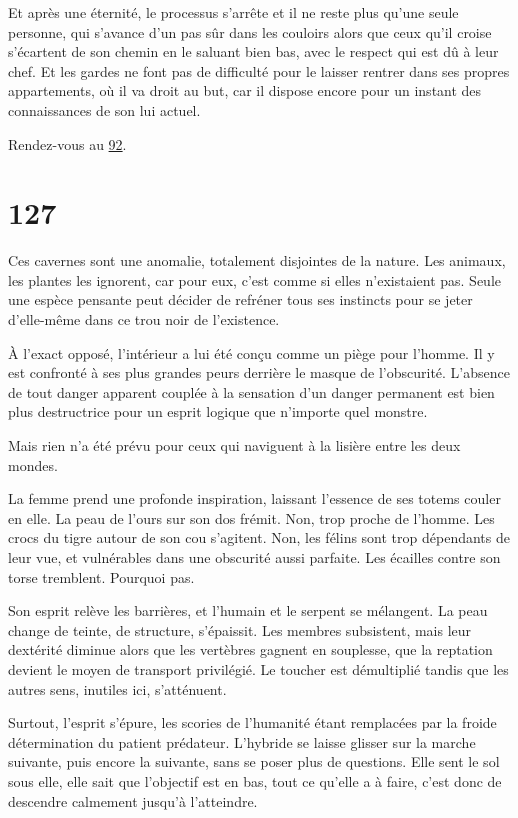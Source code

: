 \documentclass{report}
\newcommand{\gsection}[1]{
    \section{#1}
    \label{section-#1}
}
\newcommand{\glink}[1]{\hyperref[section-#1]{#1}}
\begin{document}
Et après une éternité, le processus s'arrête et il ne reste plus qu'une seule personne, qui s'avance d'un pas sûr dans les couloirs alors que ceux qu'il croise s'écartent de son chemin en le saluant bien bas, avec le respect qui est dû à leur chef. Et les gardes ne font pas de difficulté pour le laisser rentrer dans ses propres appartements, où il va droit au but, car il dispose encore pour un instant des connaissances de son lui actuel.

Rendez-vous au \glink{92}.

\gsection{127}

Ces cavernes sont une anomalie, totalement disjointes de la nature. Les animaux, les plantes les ignorent, car pour eux, c'est comme si elles n'existaient pas. Seule une espèce pensante peut décider de refréner tous ses instincts pour se jeter d'elle-même dans ce trou noir de l'existence.

À l'exact opposé, l'intérieur a lui été conçu comme un piège pour l'homme. Il y est confronté à ses plus grandes peurs derrière le masque de l'obscurité. L'absence de tout danger apparent couplée à la sensation d'un danger permanent est bien plus destructrice pour un esprit logique que n'importe quel monstre.

Mais rien n'a été prévu pour ceux qui naviguent à la lisière entre les deux mondes.

La femme prend une profonde inspiration, laissant l'essence de ses totems couler en elle. La peau de l'ours sur son dos frémit. Non, trop proche de l'homme. Les crocs du tigre autour de son cou s'agitent. Non, les félins sont trop dépendants de leur vue, et vulnérables dans une obscurité aussi parfaite. Les écailles contre son torse tremblent. Pourquoi pas.

Son esprit relève les barrières, et l'humain et le serpent se mélangent. La peau change de teinte, de structure, s'épaissit. Les membres subsistent, mais leur dextérité diminue alors que les vertèbres gagnent en souplesse, que la reptation devient le moyen de transport privilégié. Le toucher est démultiplié tandis que les autres sens, inutiles ici, s'atténuent.

Surtout, l'esprit s'épure, les scories de l'humanité étant remplacées par la froide détermination du patient prédateur. L'hybride se laisse glisser sur la marche suivante, puis encore la suivante, sans se poser plus de questions. Elle sent le sol sous elle, elle sait que l'objectif est en bas, tout ce qu'elle a à faire, c'est donc de descendre calmement jusqu'à l'atteindre.
\end{document}
